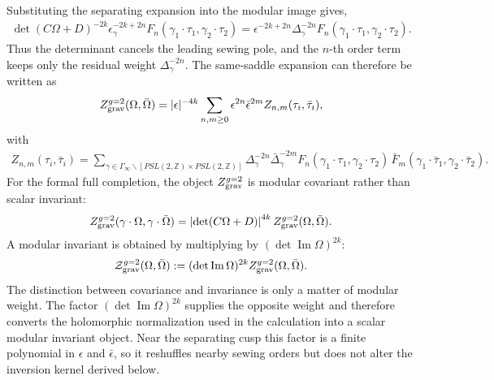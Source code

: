 \documentclass[12 pt]{article}
\begin{document}
\noindent
Substituting the separating expansion into the modular image gives,
\begin{align}
    \det(C\Omega+D)^{-2k}
    \epsilon_\gamma^{-2k+2n}
    F_n(\gamma_1\cdot\tau_1,\gamma_2\cdot\tau_2)
    =
    \epsilon^{-2k+2n}
    \Delta_\gamma^{-2n}
    F_n(\gamma_1\cdot\tau_1,\gamma_2\cdot\tau_2).
    \label{eq:det-sewing-cancellation}
\end{align}
Thus the determinant cancels the leading sewing pole, and the \(n\)-th order term keeps only the residual weight \(\Delta_\gamma^{-2n}\).  The same-saddle expansion can therefore be written as
\begin{align}
    Z_{\rm grav}^{g=2}(\Omega,\bar\Omega)
    =
    |\epsilon|^{-4k}
    \sum_{n,m\ge0}
    \epsilon^{2n}\bar\epsilon^{2m}
    Z_{n,m}(\tau_i,\bar\tau_i),
    \label{eq:Zgrav-separating}
\end{align}
with
\begin{align}
    Z_{n,m}(\tau_i,\bar\tau_i)
    =
    \sum_{\gamma\in\Gamma_{\infty}\backslash[PSL(2,\mathbb Z)\times PSL(2,\mathbb Z)]}
    \Delta_\gamma^{-2n}\bar\Delta_\gamma^{-2m}
    F_n(\gamma_1\cdot\tau_1,\gamma_2\cdot\tau_2)\,
    \bar F_m(\gamma_1\cdot\bar\tau_1,\gamma_2\cdot\bar\tau_2).
    \label{eq:Znm-def}
\end{align}
For the formal full completion, the object \(Z_{\rm grav}^{g=2}\) is modular covariant rather than scalar invariant:
\begin{align}
    Z_{\rm grav}^{g=2}(\gamma\cdot\Omega,\gamma\cdot\bar\Omega)
    =
    \left|\det(C\Omega+D)\right|^{4k}
    Z_{\rm grav}^{g=2}(\Omega,\bar\Omega).
    \label{eq:Zgrav-covariant}
\end{align}
A modular invariant is obtained by multiplying by \((\det\operatorname{Im}\Omega)^{2k}\):
\begin{align}
    \mathcal Z_{\rm grav}^{g=2}(\Omega,\bar\Omega)
    :=
    (\det\operatorname{Im}\Omega)^{2k}
    Z_{\rm grav}^{g=2}(\Omega,\bar\Omega).
    \label{eq:scalar-invariant}
\end{align}
The distinction between covariance and invariance is only a matter of modular weight.  The factor $(\det\operatorname{Im}\Omega)^{2k}$ supplies the opposite weight and therefore converts the holomorphic normalization used in the calculation into a scalar modular invariant object.  Near the separating cusp this factor is a finite polynomial in $\epsilon$ and $\bar\epsilon$, so it reshuffles nearby sewing orders but does not alter the inversion kernel derived below.
\end{document}
